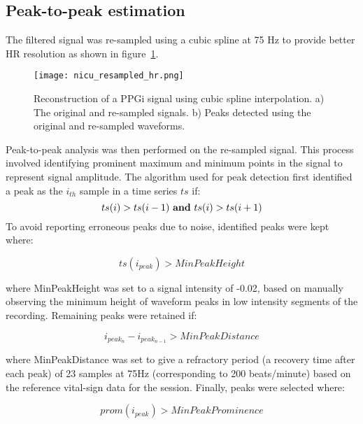  \subsection{Peak-to-peak estimation}
 \label{peaks expl HR}
 
The filtered signal was re-sampled using a cubic spline at 75 Hz to provide better HR resolution as shown in figure~\ref{resahr}.
 
\begin{figure}[!ht]
\centering
\texttt{[image: nicu\_resampled\_hr.png]}
      \caption[Reconstruction of a PPGi signal using cubic spline interpolation.] {Reconstruction of a PPGi signal using cubic spline interpolation. a) The original and re-sampled signals. b) Peaks detected using the original and re-sampled waveforms.} \label{resahr}
    \end{figure}

Peak-to-peak analysis was then performed on the re-sampled signal. This process involved identifying prominent maximum and minimum points in the signal to represent signal amplitude. The algorithm used for peak detection first identified a peak as the $i _{th}$ sample in a time series $ts$ if: 
\begin{equation}
	ts(i) > ts(i-1)\textrm{ \textbf{and} } ts(i) > ts(i+1)
\end{equation}
To avoid reporting erroneous peaks due to noise, identified peaks were kept where:

\begin{equation}
	ts(i_{peak})  > MinPeakHeight
\end{equation}

where MinPeakHeight was set to a signal intensity of -0.02, based on manually observing the minimum height of waveform peaks in low intensity segments of the recording. Remaining peaks were retained if:

\begin{equation}
	i_{peak_{n}} - i_{peak_{n-1}}  >  MinPeakDistance
\end{equation}

where MinPeakDistance was set to give a refractory period (a recovery time after each peak) of 23 samples at 75Hz (corresponding to 200 beats/minute) based on the reference vital-sign data for the session. Finally, peaks were selected where:

\begin{equation}
	prom(i_{peak}) > MinPeakProminence
\end{equation}

